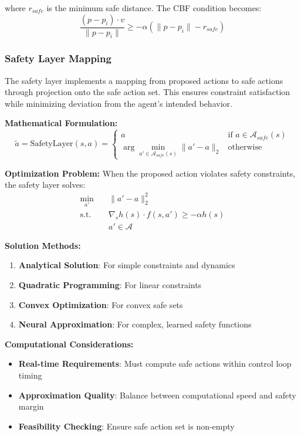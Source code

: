 \documentclass[12pt]{article}
\begin{document}
{{{{where $r_{safe}$ is the minimum safe distance. The CBF condition becomes:
\begin{equation}
\frac{(p - p_i) \cdot v}{\|p - p_i\|} \geq -\alpha (\|p - p_i\| - r_{safe})
\end{equation}

\subsubsection{Safety Layer Mapping}

The safety layer implements a mapping from proposed actions to safe actions through projection onto the safe action set. This ensures constraint satisfaction while minimizing deviation from the agent's intended behavior.

\textbf{Mathematical Formulation:}
\begin{equation}
\tilde{a} = \text{SafetyLayer}(s, a) =
\begin{cases}
a & \text{if } a \in \mathcal{A}_{safe}(s) \\
\arg\min_{a' \in \mathcal{A}_{safe}(s)} \|a' - a\|_2 & \text{otherwise}
\end{cases}
\end{equation}

\textbf{Optimization Problem:}
When the proposed action violates safety constraints, the safety layer solves:
\begin{align}
\min_{a'} \quad & \|a' - a\|_2^2 \\
\text{s.t.} \quad & \nabla_s h(s) \cdot f(s,a') \geq -\alpha h(s) \\
& a' \in \mathcal{A}
\end{align}

\textbf{Solution Methods:}
\begin{enumerate}
\item \textbf{Analytical Solution}: For simple constraints and dynamics
\item \textbf{Quadratic Programming}: For linear constraints
\item \textbf{Convex Optimization}: For convex safe sets
\item \textbf{Neural Approximation}: For complex, learned safety functions
\end{enumerate}

\textbf{Computational Considerations:}
\begin{itemize}
\item \textbf{Real-time Requirements}: Must compute safe actions within control loop timing
\item \textbf{Approximation Quality}: Balance between computational speed and safety margin
\item \textbf{Feasibility Checking}: Ensure safe action set is non-empty
\end{itemize}

}}}}
\end{document}
